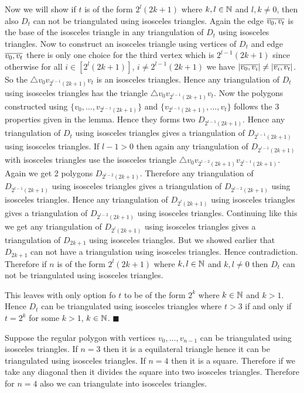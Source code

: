 \documentclass[a4paper, 11pt]{article}
\renewenvironment{proof}{\noindent{\it \textbf{Proof:}}\hspace*{1em}}{\hfill $\blacksquare$\bigskip\\}
\begin{document}
{\begin{itemize}[label=$\bullet$]
\begin{itemize}
\begin{proof}
	Now we will show if $t$ is of the form $2^l(2k+1)$ where $k,l\in\mathbb{N}$ and $l,k\neq 0$, then also $D_t$ can not be triangulated using isosceles triangles. Again the edge $\overline{v_0,v_t}$ is the base of the isosceles triangle in any triangulation of $D_t$ using isosceles triangles. Now to construct an isosceles triangle using vertices of $D_t$ and edge $\overline{v_0,v_t}$ there is only one choice for the third vertex which is $2^{l-1}(2k+1)$ since otherwise for all $i\in [2^l(2k+1)]$, $i\neq 2^{l-1}(2k+1)$ we have $|\overline{v_0,v_i}|\neq |\overline{v_i,v_t}|$. So the $\triangle v_0v_{2^{l-1}(2k+1)}v_t$ is an isosceles triangles. Hence any triangulation of $D_t$ using isosceles triangles has the triangle $\triangle v_0v_{2^{l-1}(2k+1)}v_t$. Now the polygons constructed using $\{v_0,\dots, v_{2^{l-1}(2k+1)}\}$ and $\{v_{2^{l-1}(2k+1)},\dots, v_t\}$ follows the 3 properties given in the lemma. Hence they forms two $D_{{2^{l-1}(2k+1)}}$. Hence any triangulation of $D_t$ using isosceles triangles gives a triangulation of $D_{2^{l-1}(2k+1)}$ using isosceles triangles. If $l-1>0$ then again any triangulation of $D_{2^{l-1}(2k+1)}$ with isosceles triangles use the isosceles triangle $\triangle v_0 v_{2^{l-2}(2k+1)}v_{2^{l-1}(2k+1)}$. Again we get 2 polygons $D_{2^{l-2}(2k+1)}$. Therefore any triangulation  of $D_{2^{l-1}(2k+1)}$ using isosceles triangles gives a triangulation of $D_{2^{l-2}(2k+1)}$ using isosceles triangles. Hence any triangulation of $D_{2^l(2k+1)}$ using isosceles triangles gives a triangulation of $D_{2^{l-2}(2k+1)}$ using isosceles triangles. Continuing like this we get any triangulation of $D_{2^l(2k+1)}$ using isosceles triangles gives a triangulation of $D_{2k+1}$ using isosceles triangles. But we showed earlier that $D_{2k+1}$ can not have   a triangulation using isosceles triangles. Hence contradiction. Therefore if $n$ is of the form $2^l(2k+1)$ where $k,l\in\mathbb{N}$ and $k,l\neq 0$ then $D_t$ can not be triangulated using isosceles triangles.
	
	This leaves with only option fo $t$ to be of the form $2^k$ where $k\in \mathbb{N}$ and $k>1$. Hence $D_t$ can be triangulated using isosceles triangles where $t>3$ if and only if $t=2^k$ for some $k>1$, $k\in\mathbb{N}$.
\end{proof}

Suppose the regular polygon with vertices $v_0,\dots, v_{n-1}$ can be triangulated using isosceles triangles. If $n=3$ then it is a equilateral triangle hence it can be triangulated using isosceles triangles. If $n=4$ then it is a square. Therefore if we take any diagonal then it divides the square into two isosceles triangles. Therefore for $n=4$ also we can triangulate into isosceles triangles.


\end{itemize}
\end{itemize}}
\end{document}
